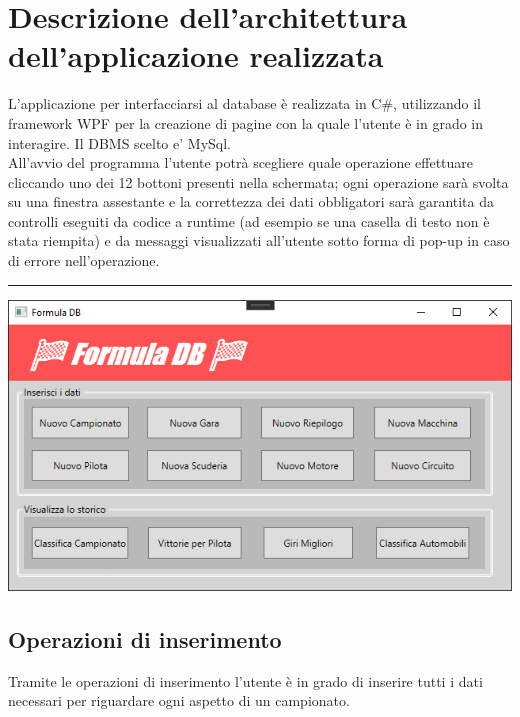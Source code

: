 \documentclass[a4paper,12pt]{report}
\begin{document}
{{		\section{Descrizione dell'architettura dell'applicazione realizzata}
			L'applicazione per interfacciarsi al database è realizzata in C\#, utilizzando il framework
			WPF per la creazione di pagine con la quale l'utente è in grado in interagire.
			Il DBMS scelto e' MySql.\\
			All'avvio del programma l'utente potrà scegliere quale operazione effettuare cliccando uno dei 12 bottoni 
			presenti nella schermata; ogni operazione sarà svolta su una finestra assestante e la correttezza dei dati obbligatori
			sarà garantita da controlli eseguiti da codice a runtime (ad esempio se una casella di testo non è stata riempita) e 
			da messaggi visualizzati all'utente sotto forma di pop-up in caso di errore nell'operazione.
			\par\noindent\rule{\textwidth}{0.4pt}
			\begin{center}
								\hspace*{-1cm}%
								\includegraphics{copies/gui.png} 
								\hspace*{-4cm}%
							\end{center}
			\pagebreak
			\subsection{Operazioni di inserimento}
				Tramite le operazioni di inserimento l'utente è in grado di inserire tutti i dati necessari per riguardare ogni aspetto di un campionato.
}}
\end{document}
